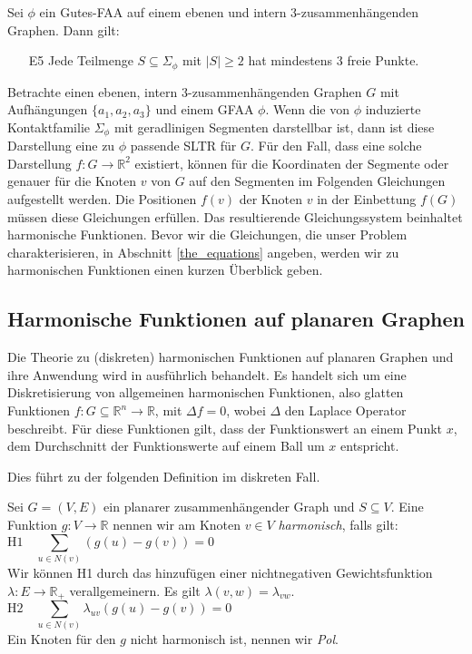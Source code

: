 \begin{lemma}\cite[Lemma 2.8]{af13}\label{lemma_af13}
Sei $\phi$ ein Gutes-FAA auf einem ebenen und intern 3-zusammenhängenden Graphen. Dann gilt: 
\begin{itemize}
\item [E5] Jede Teilmenge $S \subseteq \Sigma_{\phi}$ mit $|S| \geq 2$ hat mindestens 3 freie Punkte.
\end{itemize}
\end{lemma}

Betrachte einen ebenen, intern 3-zusammenhängenden Graphen $G$ mit Aufhängungen $\{a_1,a_2,a_3\}$ und einem GFAA $\phi$. Wenn die von $\phi$ induzierte Kontaktfamilie $\Sigma_{\phi}$ mit geradlinigen Segmenten darstellbar ist, dann ist diese Darstellung eine zu $\phi$ passende SLTR für $G$. Für den Fall, dass eine solche Darstellung $f:G\to\mathbb{R}^2$ existiert, können für die Koordinaten der Segmente oder genauer für die Knoten $v$ von $G$ auf den Segmenten im Folgenden Gleichungen aufgestellt werden. Die Positionen $f(v)$ der Knoten $v$ in der Einbettung $f(G)$ müssen diese Gleichungen erfüllen. Das resultierende Gleichungssystem beinhaltet harmonische Funktionen. Bevor wir die Gleichungen, die unser Problem charakterisieren, in Abschnitt \ref{the_equations} angeben, werden wir zu harmonischen Funktionen einen kurzen Überblick geben.

\subsection{Harmonische Funktionen auf planaren Graphen}

Die Theorie zu (diskreten) harmonischen Funktionen auf planaren Graphen und ihre Anwendung wird in \cite{lov99} ausführlich behandelt. Es handelt sich um eine Diskretisierung von allgemeinen harmonischen Funktionen, also glatten Funktionen $f:G\subseteq \mathbb{R}^n \to \mathbb{R}$, mit $\Delta f = 0$, wobei $\Delta$ den Laplace Operator beschreibt. Für diese Funktionen gilt, dass der Funktionswert an einem Punkt $x$, dem Durchschnitt der Funktionswerte auf einem Ball um $x$ entspricht. 

Dies führt zu der folgenden Definition im diskreten Fall.

\begin{definition}
Sei $G=(V,E)$ ein planarer zusammenhängender Graph und $S \subseteq V$. Eine Funktion $g:V \to \mathbb{R}$ nennen wir am Knoten $v \in V$ \textit{harmonisch}, falls gilt:
$$ \text{H1} \quad \sum_{u \in N(v)}(g(u) - g(v)) = 0 \quad \qquad\qquad \qquad\qquad\qquad\qquad\qquad\qquad\qquad\quad\:\,\:$$
Wir können H1 durch das hinzufügen einer nichtnegativen Gewichtsfunktion $\lambda:E\to\mathbb{R}_+$ verallgemeinern. Es gilt $\lambda(v,w) = \lambda_{vw}$.
$$ \text{H2}\quad \sum_{u \in N(v)}\lambda_{uv}(g(u) - g(v)) = 0 \quad\qquad \qquad\qquad \qquad\qquad\qquad\qquad\qquad\qquad$$
Ein Knoten für den $g$ nicht harmonisch ist, nennen wir \textit{Pol}.
\end{definition}

